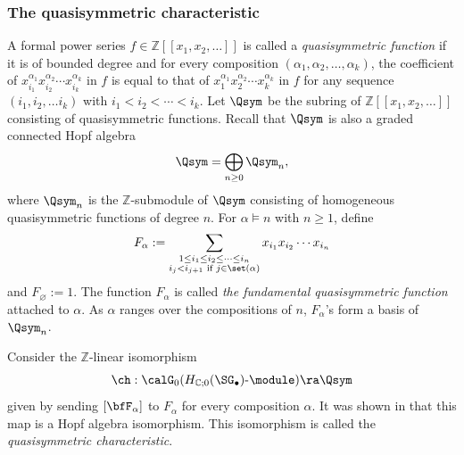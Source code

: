 \documentclass[12pt, reqno]{amsart}
\theoremstyle{plain}
\theoremstyle{definition}
\numberwithin{equation}{section}
\numberwithin{figure}{section}
\numberwithin{table}{section}
\def\Z{\mathbb Z}
\def\C{\mathbb C}
\begin{document}
\subsubsection{The quasisymmetric characteristic}
A formal power series $f \in \Z[[x_1, x_2, \ldots]]$ is called a \emph{quasisymmetric function} if it is of bounded degree and for every composition $(\alpha_1, \alpha_2, \ldots, \alpha_k)$, the coefficient of $x_{i_1}^{\alpha_1} x_{i_2}^{\alpha_2} \cdots x_{i_k}^{\alpha_k}$ in $f$ is equal to that of  $x_{1}^{\alpha_1} x_{2}^{\alpha_2} \cdots x_{k}^{\alpha_k}$ in $f$ for any sequence $(i_1, i_2, \ldots i_k)$ with  $i_1 < i_2 < \cdots <i_k$.
Let $\Qsym$ be the subring of $\Z[[x_1, x_2, \ldots]]$ consisting of quasisymmetric functions.
Recall that $\Qsym$ is also a graded connected Hopf algebra
\[
\Qsym = \bigoplus_{n \geq 0} \Qsym_n,
\]
where $\Qsym_n$ is the $\Z$-submodule of $\Qsym$ consisting of homogeneous quasisymmetric functions of degree $n$.
For $\alpha \models n$ with $n \geq 1$, define 
\[
F_\alpha := \sum_{\substack{1 \le i_1 \le i_2 \le \cdots \le i_n \\ i_j < i_{j+1} \text{ if } j \in \set(\alpha)}} x_{i_1}x_{i_2} \cdots x_{i_n}
\]
and 
$F_{\varnothing} := 1$.
The function $F_\alpha$ is called \emph{the fundamental quasisymmetric function} attached to $\alpha$.
As $\alpha$ ranges over the compositions of $n$, $F_\alpha$'s form a basis of $\Qsym_n$.



Consider the $\Z$-linear isomorphism
\[
\ch: \calG_0(H_{\C;0}(\SG_\bullet)\text{-}\module) \ra \Qsym
\]
given by sending
 $[\bfF_\alpha]$ to $F_\alpha$ for every composition $\alpha$.
It was shown in \cite{96DKLT, 09BL} that this map is a  Hopf algebra isomorphism.
This isomorphism is called the 
\emph{quasisymmetric characteristic}.
\end{document}
